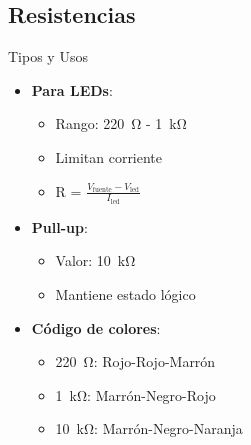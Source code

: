 \subsection{Resistencias}
\begin{componentBox}{Tipos y Usos \citep{platt2014encyclopedia}}
	\begin{itemize}[leftmargin=*,itemsep=1pt,parsep=1pt]
		\item \textbf{Para LEDs}:
		\begin{itemize}[itemsep=0pt,parsep=0pt]
			\item Rango: \SI{220}{\ohm} - \SI{1}{\kilo\ohm}
			\item Limitan corriente
			\item R = $\frac{V_{\text{fuente}} - V_{\text{led}}}{I_{\text{led}}}$
		\end{itemize}
		\item \textbf{Pull-up}:
		\begin{itemize}[itemsep=0pt,parsep=0pt]
			\item Valor: \SI{10}{\kilo\ohm}
			\item Mantiene estado lógico
		\end{itemize}
		\item \textbf{Código de colores}:
		\begin{itemize}[itemsep=0pt,parsep=0pt]
			\item \SI{220}{\ohm}: Rojo-Rojo-Marrón
			\item \SI{1}{\kilo\ohm}: Marrón-Negro-Rojo
			\item \SI{10}{\kilo\ohm}: Marrón-Negro-Naranja
		\end{itemize}
	\end{itemize}
\end{componentBox}

